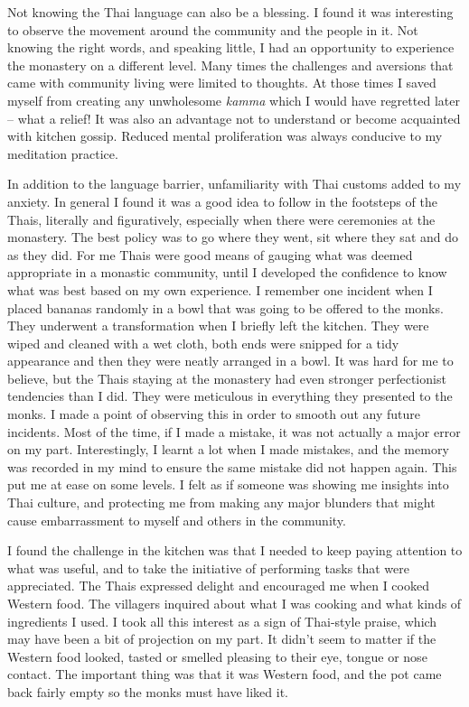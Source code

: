 Not knowing the Thai language can also be a blessing. I found it was
interesting to observe the movement around the community and the people
in it. Not knowing the right words, and speaking little, I had an
opportunity to experience the monastery on a different level. Many times
the challenges and aversions that came with community living were
limited to thoughts. At those times I saved myself from creating any
unwholesome \emph{kamma} which I would have regretted later -- what a
relief! It was also an advantage not to understand or become acquainted
with kitchen gossip. Reduced mental proliferation was always conducive
to my meditation practice. 

In addition to the language barrier, unfamiliarity with Thai customs
added to my anxiety. In general I found it was a good idea to follow in
the footsteps of the Thais, literally and figuratively, especially when
there were ceremonies at the monastery. The best policy was to go where
they went, sit where they sat and do as they did. For me Thais were good
means of gauging what was deemed appropriate in a monastic community, 
until I developed the confidence to know what was best based on my own
experience. I remember one incident when I placed bananas randomly in a
bowl that was going to be offered to the monks. They underwent a
transformation when I briefly left the kitchen. They were wiped and
cleaned with a wet cloth, both ends were snipped for a tidy appearance
and then they were neatly arranged in a bowl. It was hard for me to
believe, but the Thais staying at the monastery had even stronger
perfectionist tendencies than I did. They were meticulous in everything
they presented to the monks. I made a point of observing this in order
to smooth out any future incidents. Most of the time, if I made a
mistake, it was not actually a major error on my part. Interestingly, I
learnt a lot when I made mistakes, and the memory was recorded in my
mind to ensure the same mistake did not happen again. This put me at
ease on some levels. I felt as if someone was showing me insights into
Thai culture, and protecting me from making any major blunders that
might cause embarrassment to myself and others in the community. 

I found the challenge in the kitchen was that I needed to keep paying
attention to what was useful, and to take the initiative of performing
tasks that were appreciated. The Thais expressed delight and encouraged
me when I cooked Western food. The villagers inquired about what I was
cooking and what kinds of ingredients I used. I took all this interest
as a sign of Thai-style praise, which may have been a bit of projection
on my part. It didn't seem to matter if the Western food looked, tasted
or smelled pleasing to their eye, tongue or nose contact. The important
thing was that it was Western food, and the pot came back fairly empty
so the monks must have liked it. 

